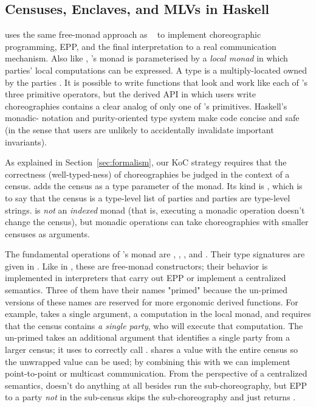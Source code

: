 \subsection{Censuses, Enclaves, and MLVs in Haskell}
\label{sec:multichor}

\MultiChor uses the same free-monad approach as \HasChor~\cite{shen-haschor} to implement choreographic programming, EPP,
and the final interpretation to a real communication mechanism.
Also like \HasChor, \MultiChor's  monad is parameterised by a \emph{local monad} in which parties' local computations can be expressed.
A \MultiChor type  is a multiply-located  owned by the parties .
It is possible to write \MultiChor functions that look and work like each of \HasChor's three primitive operators,
but the derived API in which users write \MultiChor choreographies contains a clear analog of only one of \HasChor's primitives.
Haskell's monadic- notation and purity-oriented type system make \MultiChor code concise and safe
(in the sense that users are unlikely to accidentally invalidate important invariants).

As explained in Section~\ref{sec:formalism},
our KoC strategy requires that the correctness (well-typed-ness) of choreographies be judged in the context of a census.
\MultiChor adds the census as a type parameter of the  monad.
Its kind is \inlinecode{[Symbol]},
which is to say that the census is a type-level list of parties and parties are type-level strings.
 is \emph{not} an \emph{indexed} monad (that is, executing a monadic operation doesn't change the census),
but monadic operations can take choreographies with smaller censuses as arguments.

The fundamental operations of \MultiChor's  monad are
, , , and .
Their type signatures are given in .
Like in \HasChor, these are free-monad constructors; their behavior is implemented in interpreters
that carry out EPP or implement a centralized semantics.
Three of them have their names "primed" because the un-primed versions of these names are reserved for more ergonomic derived functions.
For example,  takes a single argument, a computation in the local monad, and requires that the census contains
\emph{a single party}, who will execute that computation.
The un-primed  takes an additional argument that identifies a single party from a larger census;
it uses  to correctly call .
 shares a  value with the entire census so the unwrapped value can be used;
by combining this with  we can implement point-to-point or multicast communication.
From the perspective of a centralized semantics,  doesn't do anything at all besides run
the sub-choreography,
but EPP to a party \emph{not} in the sub-census skips the sub-choreography and just returns .

